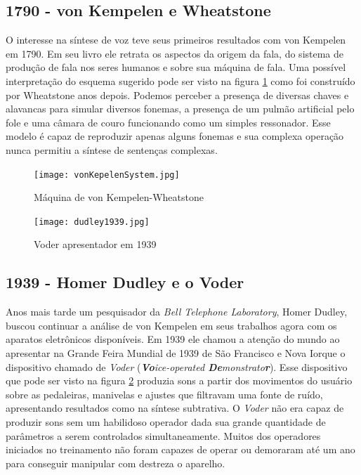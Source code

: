 \subsection{1790 - von Kempelen e Wheatstone}
O interesse na síntese de voz teve seus primeiros resultados com von Kempelen em 1790. Em seu livro \cite{vonKempelen1791} ele retrata os aspectos da origem da fala, do sistema de produção de fala nos seres humanos e sobre sua máquina de fala. Uma possível interpretação do esquema sugerido pode ser visto na figura \ref{fig:vonKempelenSystem} como foi construído por Wheatstone anos depois. Podemos perceber a presença de diversas chaves e alavancas para simular diversos fonemas, a presença de um pulmão artificial pelo fole e uma câmara de couro funcionando como um simples ressonador. Esse modelo é capaz de reproduzir apenas alguns fonemas e sua complexa operação nunca permitiu a síntese de sentenças complexas.

\begin{figure}[t]
    \centering
    \texttt{[image: vonKepelenSystem.jpg]}
    \caption{Máquina de von Kempelen-Wheatstone}
    \label{fig:vonKempelenSystem}
\end{figure}

\begin{figure}[b]
    \centering
    \vspace{-13pt}
    \texttt{[image: dudley1939.jpg]}
    \caption{Voder apresentador em 1939}
    \label{fig:dudley1939}
\end{figure}

\subsection{1939 - Homer Dudley e o Voder}
Anos mais tarde um pesquisador da \textit{Bell Telephone Laboratory}, Homer Dudley, buscou continuar a análise de von Kempelen em seus trabalhos \cite{doi:10.1121/1.1906583} \cite{goldSpeech} agora com os aparatos eletrônicos disponíveis. Em 1939 ele chamou a atenção do mundo ao apresentar na Grande Feira Mundial de 1939 de São Francisco e Nova Iorque o dispositivo chamado de \emph{Voder} (\textit{\textbf{Vo}ice-operated \textbf{De}monstrato\textbf{r}}). Esse dispositivo que pode ser visto na figura \ref{fig:dudley1939} produzia sons a partir dos movimentos do usuário sobre as pedaleiras, manivelas e ajustes que filtravam uma fonte de ruído, apresentando resultados como na síntese subtrativa. O \textit{Voder} não era capaz de produzir sons sem um habilidoso operador dada sua grande quantidade de parâmetros a serem controlados simultaneamente. Muitos dos operadores iniciados no treinamento não foram capazes de operar ou demoraram até um ano para conseguir manipular com destreza o aparelho. 


